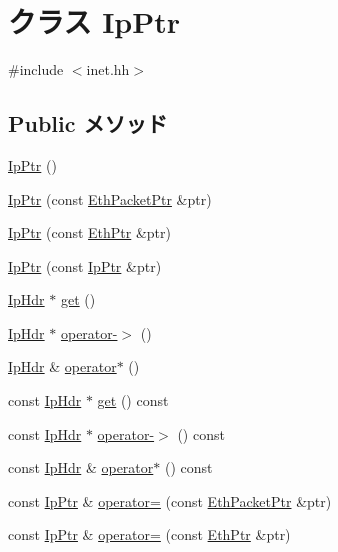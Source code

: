\hypertarget{classNet_1_1IpPtr}{
\section{クラス IpPtr}
\label{classNet_1_1IpPtr}
}


{\ttfamily \#include $<$inet.hh$>$}\subsection*{Public メソッド}
\begin{DoxyCompactItemize}
\item 
\hyperlink{classNet_1_1IpPtr_a31b5c090bf379e291000879aa49a8af6}{IpPtr} ()
\item 
\hyperlink{classNet_1_1IpPtr_ae8184005d4874fca0a6abb2b940e9649}{IpPtr} (const \hyperlink{classRefCountingPtr}{EthPacketPtr} \&ptr)
\item 
\hyperlink{classNet_1_1IpPtr_adc162de1f572a7cadab4cc93b61cf2c4}{IpPtr} (const \hyperlink{classNet_1_1EthPtr}{EthPtr} \&ptr)
\item 
\hyperlink{classNet_1_1IpPtr_a9eb7bc9c16efeb9f19f09a3e4ff89dcc}{IpPtr} (const \hyperlink{classNet_1_1IpPtr}{IpPtr} \&ptr)
\item 
\hyperlink{structNet_1_1IpHdr}{IpHdr} $\ast$ \hyperlink{classNet_1_1IpPtr_ad540e4acc1acafd79e71d9680bdc66f9}{get} ()
\item 
\hyperlink{structNet_1_1IpHdr}{IpHdr} $\ast$ \hyperlink{classNet_1_1IpPtr_a7091b007cde47df0c303a0c1dd10fa01}{operator-\/$>$} ()
\item 
\hyperlink{structNet_1_1IpHdr}{IpHdr} \& \hyperlink{classNet_1_1IpPtr_af7ec99d1e439b4734cca731edef84bdc}{operator$\ast$} ()
\item 
const \hyperlink{structNet_1_1IpHdr}{IpHdr} $\ast$ \hyperlink{classNet_1_1IpPtr_a3558d2be06e557d21b960c7cacb91b76}{get} () const 
\item 
const \hyperlink{structNet_1_1IpHdr}{IpHdr} $\ast$ \hyperlink{classNet_1_1IpPtr_a900bb7613ccda315763fa19c10202f94}{operator-\/$>$} () const 
\item 
const \hyperlink{structNet_1_1IpHdr}{IpHdr} \& \hyperlink{classNet_1_1IpPtr_a304f52e91f52d5f6971631f4a7dda56c}{operator$\ast$} () const 
\item 
const \hyperlink{classNet_1_1IpPtr}{IpPtr} \& \hyperlink{classNet_1_1IpPtr_a373856ac40644c22335b0b137e2a9bb4}{operator=} (const \hyperlink{classRefCountingPtr}{EthPacketPtr} \&ptr)
\item 
const \hyperlink{classNet_1_1IpPtr}{IpPtr} \& \hyperlink{classNet_1_1IpPtr_ac147460b6f6c5c20d843d221874da926}{operator=} (const \hyperlink{classNet_1_1EthPtr}{EthPtr} \&ptr)

\end{DoxyCompactItemize}
